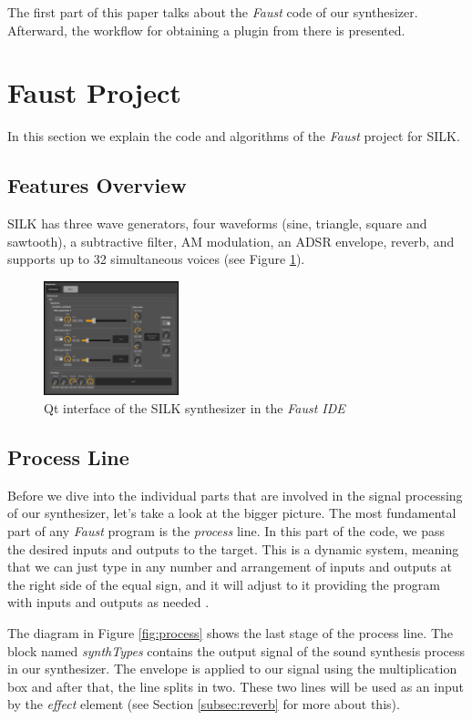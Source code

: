 \documentclass{aes2e}
\begin{document}
The first part of this paper talks about the \textit{Faust} code of our synthesizer. Afterward, the workflow for obtaining a plugin from there is presented.

\section{Faust Project}
In this section we explain the code and algorithms of the \textit{Faust} project for SILK.

\subsection{Features Overview}
SILK has three wave generators, four waveforms (sine, triangle, square and sawtooth), a subtractive filter, AM modulation, an ADSR envelope, reverb, and supports up to 32 simultaneous voices (see Figure \ref{fig:silk_gui_qt}).

\begin{figure}[h]
\centering
\includegraphics[width=0.35\textwidth]{Figures/silk-gui-qt.jpg}
\caption{Qt interface of the SILK synthesizer in the \textit{Faust IDE}}
\label{fig:silk_gui_qt}
\end{figure}

\subsection{Process Line}
Before we dive into the individual parts that are involved in the signal processing of our synthesizer, let's take a look at the bigger picture. The most fundamental part of any \textit{Faust} program is the \textit{process} line. In this part of the code, we pass the desired inputs and outputs to the target. This is a dynamic system, meaning that we can just type in any number and arrangement of inputs and outputs at the right side of the equal sign, and it will adjust to it providing the program with inputs and outputs as needed \cite{FDOC}.

The diagram in Figure \ref{fig:process} shows the last stage of the process line. The block named \textit{synthTypes} contains the output signal of the sound synthesis process in our synthesizer. The envelope is applied to our signal using the multiplication box and after that, the line splits in two. These two lines will be used as an input by the \textit{effect} element (see Section \ref{subsec:reverb} for more about this).
\end{document}
